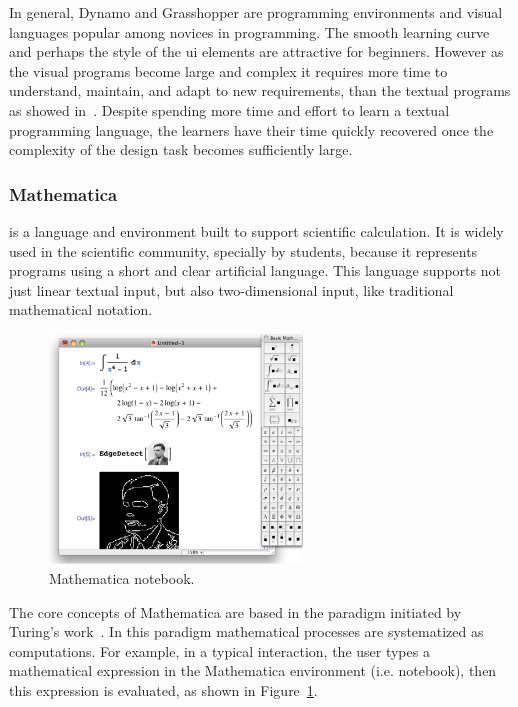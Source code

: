 In general, Dynamo and Grasshopper are programming environments and visual languages popular among novices in programming. The smooth learning curve and perhaps the style of the \ac{ui} elements are attractive for beginners. However as the visual programs become large and complex it requires more time to understand, maintain, and adapt to new requirements, than the textual programs as showed in~\cite{leitao2011programming}. Despite spending more time and effort to learn a textual programming language, the learners have their time quickly recovered once the complexity of the design task becomes sufficiently large.
\subsubsection{Mathematica~\cite{wolfram1991mathematica}} is a language and environment built to support scientific calculation. It is widely used in the scientific community, specially by students, because it represents programs using a short and clear artificial language. This language supports not just linear textual input, but also two-dimensional input, like traditional mathematical notation.

\begin{figure}
  \vspace{-30pt}
  \begin{center}
    \includegraphics[width=0.6\textwidth]{img/mathematica}
  \end{center}
  \vspace{-15pt}
 \caption{Mathematica notebook.}  
  \vspace{-20pt}
    \label{fig:math}
\end{figure}

The core concepts of Mathematica are based in the paradigm initiated by Turing's work~\cite{wolfram2003wolfram}. In this paradigm mathematical processes are systematized as computations. For example, in a typical interaction, the user types a mathematical expression in the Mathematica environment (i.e. notebook), then this expression is evaluated, as shown in Figure~\ref{fig:math}.  

